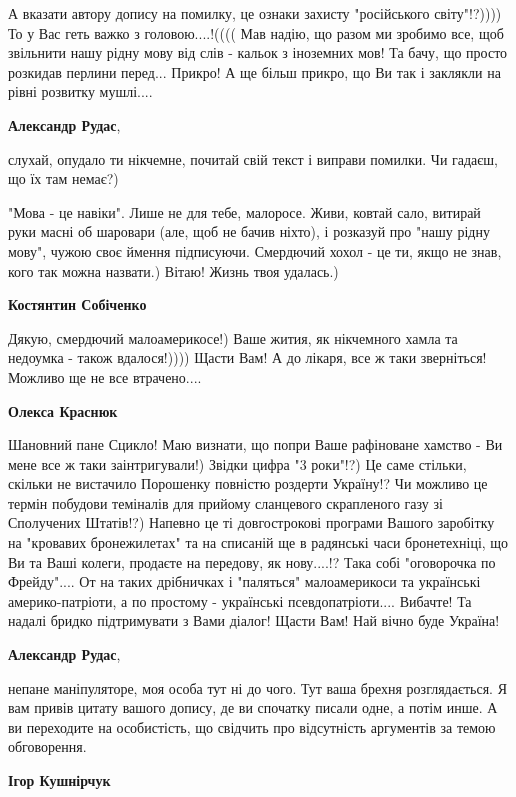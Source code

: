 \begin{itemize}
\begin{itemize}
\obeycr
А вказати автору допису на помилку, це ознаки захисту "російського світу"!?))))
То у Вас геть важко з головою....!((((
Мав надію, що разом ми зробимо все, щоб звільнити нашу рідну мову від слів - кальок з іноземних мов!
Та бачу, що просто розкидав перлини перед...
Прикро!
А ще більш прикро, що Ви так і заклякли на рівні розвитку мушлі....
\restorecr

\textbf{Александр Рудас}, 

слухай, опудало ти нікчемне, почитай свій текст і виправи помилки. Чи гадаєш,
що їх там немає?)

"Мова - це навіки". Лише не для тебе, малоросе. Живи, ковтай сало, витирай руки
масні об шаровари (але, щоб не бачив ніхто), і розказуй про "нашу рідну мову",
чужою своє ймення підписуючи. Смердючий хохол - це ти, якщо не знав, кого так
можна назвати.) Вітаю! Жизнь твоя удалась.)

\textbf{Костянтин Собіченко}

\obeycr
Дякую, смердючий малоамерикосе!)
Ваше жития, як нікчемного хамла та недоумка - також вдалося!))))
Щасти Вам!
А до лікаря, все ж таки зверніться!
Можливо ще не все втрачено....
\restorecr

\textbf{Олекса Краснюк}

\obeycr
Шановний пане Сцикло!
Маю визнати, що попри Ваше рафіноване хамство - Ви мене все ж таки заінтригували!)
Звідки цифра "3 роки"!?)
Це саме стільки, скільки не вистачило Порошенку повністю роздерти Україну!? Чи можливо це термін побудови теміналів для прийому сланцевого скрапленого газу зі Сполучених Штатів!?)
Напевно це ті довгострокові програми Вашого заробітку на "кровавих бронежилетах" та на списаній ще в радянські часи бронетехніці, що Ви та Ваші колеги, продаєте на передову, як нову....!?
Така собі "оговорочка по Фрейду"....
От на таких дрібничках і "паляться" малоамерикоси та українські америко-патріоти, а по простому - українські псевдопатріоти....
Вибачте! Та надалі бридко підтримувати з Вами діалог!
Щасти Вам!
Най вічно буде Україна!
\restorecr

\textbf{Александр Рудас}, 

непане маніпуляторе, моя особа тут ні до чого. Тут ваша брехня розглядається. Я
вам привів цитату вашого допису, де ви спочатку писали одне, а потім инше. А ви
переходите на особистість, що свідчить про відсутність аргументів за темою
обговорення.

\textbf{Ігор Кушнірчук}


\end{itemize}
\end{itemize}
